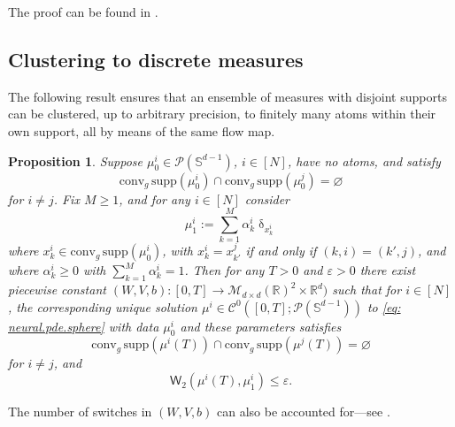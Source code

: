 \documentclass[a4paper,11pt]{article}
\theoremstyle{plain}
\newtheorem{proposition}[theorem]{Proposition}
\newcommand{\supp}{\mathrm{supp}}
\newcommand{\R}{\mathbb{R}}
\newcommand{\conv}{\mathrm{conv}}
\renewcommand{\S}{\mathbb{S}^{d-1}}
\newcommand{\bW}{\bm{\mathit{W}}}
\newcommand{\bV}{\bm{\mathit{V}}}
\renewcommand{\leq}{\leqslant}
\renewcommand{\geq}{\geqslant}
\numberwithin{equation}{section}
\newcommand{\ndpr}[1]{ {\colorbox{MIT}{\color{white} \textsf{PR}} \color{MIT}{#1}} }
\begin{document}
The proof can be found in {\bf {}}.




\subsection{Clustering to discrete measures} \label{sec: general.dirac}

The following result ensures that an ensemble of measures with disjoint supports can be clustered, up to arbitrary precision, to finitely many atoms within their own support, all by means of the same flow map. 

\begin{proposition} \label{prop: compression}
Suppose $\mu_0^i\in\mathscr{P}(\S)$, $i\in[N]$, have no atoms, and satisfy
\begin{equation*}
\conv_g\,\supp(\mu^i_0)\cap\conv_g\,\supp(\mu_0^j)=\varnothing
\end{equation*}
for $i\neq j$. Fix $M\geq1$, and for any $i\in[N]$ consider
\begin{equation*}
    \mu^i_1:=\sum_{k=1}^M \alpha_k^i \updelta_{x_{k}^i}
\end{equation*}
where $x_k^i\in\conv_g\,\supp(\mu_0^i)$, with $x_k^i = x_{k'}^j$ if and only if $(k, i) = (k', j)$, and where $\alpha_k^i\geq 0$ with $\sum_{k=1}^M\alpha_k^i=1$. Then for any $T>0$ and $\varepsilon>0$ there exist piecewise constant $(\bW,\bV,b):[0,T]\to\mathscr{M}_{d\times d}(\R)^2\times\R^d)$ such that for $i\in[N]$, the corresponding unique solution $\mu^i\in \mathscr{C}^0([0,T];\mathscr{P}(\S))$ to \eqref{eq: neural.pde.sphere} with data $\mu_0^i$ and these parameters satisfies
\begin{equation*}
\conv_g\,\supp\left(\mu^i(T)\right)\cap\conv_g\,\supp\left(\mu^j(T)\right)=\varnothing
\end{equation*}
for $i\neq j$, and 
\begin{equation*}
\mathsf{W}_2\left(\mu^i(T),\mu_1^{i}\right)\leq\varepsilon.
\end{equation*}
\end{proposition}

The number of switches in $(\bW,\bV, b)$ can also be accounted for---see .





\end{document}
